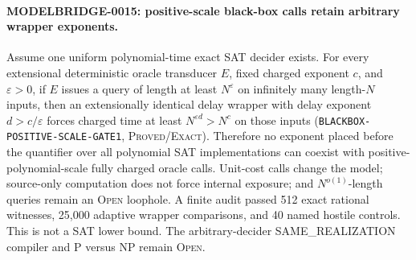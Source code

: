 \paragraph{MODELBRIDGE-0015: positive-scale black-box calls retain arbitrary wrapper exponents.}
Assume one uniform polynomial-time exact SAT decider exists.  For every
extensional deterministic oracle transducer $E$, fixed charged exponent $c$,
and $\varepsilon>0$, if $E$ issues a query of length at least $N^\varepsilon$
on infinitely many length-$N$ inputs, then an extensionally identical delay
wrapper with delay exponent $d>c/\varepsilon$ forces charged time at least
$N^{\varepsilon d}>N^c$ on those inputs
(\texttt{BLACKBOX-POSITIVE-SCALE-GATE1}, \textsc{Proved/Exact}).  Therefore
no exponent placed before the quantifier over all polynomial SAT
implementations can coexist with positive-polynomial-scale fully charged
oracle calls.  Unit-cost calls change the model; source-only computation does
not force internal exposure; and $N^{o(1)}$-length queries remain an
\textsc{Open} loophole.  A finite audit passed 512 exact rational witnesses,
25,000 adaptive wrapper comparisons, and 40 named hostile controls.
This is not a SAT lower bound.  The arbitrary-decider SAME\_REALIZATION
compiler and P versus NP remain \textsc{Open}.

